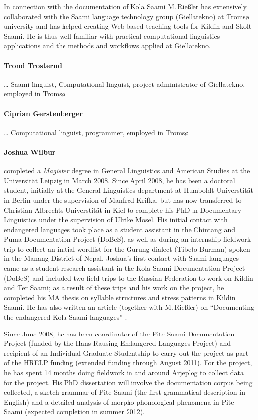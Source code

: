 \documentclass[a4paper,12pt]{article}
\begin{document}
{{{{In connection with the documentation of Kola Saami M.\,Rießler has extensively collaborated with the Saami language technology group (Giellatekno) at Tromsø university and has helped creating Web-based teaching tools for Kildin and Skolt Saami. He is thus well familiar with practical computational linguistics applications and the methods and workflows applied at Giellatekno.

\paragraph{Trond Trosterud} … Saami linguist, Computational linguist, project administrator of Giellatekno, employed in Tromsø

\paragraph{Ciprian Gerstenberger} … Computational linguist, programmer, employed in Tromsø

\paragraph{Joshua Wilbur} completed a \textit{Magister} degree in General Linguistics and American Studies at the Universität Leipzig in March 2008. Since April 2008, he has been a doctoral student, initially at the General Linguistics department at Humboldt-Universtität in Berlin under the supervision of Manfred Krifka, but has now transferred to Christian-Albrechts-Universtität in Kiel to complete his PhD in Documentary Linguistics under the supervision of Ulrike Mosel. His initial contact with endangered languages took place as a student assistant in the Chintang and Puma Documentation Project (DoBeS), as well as during an internship fieldwork trip to collect an initial wordlist for the Gurung dialect (Tibeto-Burman) spoken in the Manang District of Nepal. Joshua's first contact with Saami languages came as a student research assistant in the Kola Saami Documentation Project (DoBeS) and included two field trips to the Russian Federation to work on Kildin and Ter Saami; as a result of these trips and his work on the project, he completed his MA thesis on syllable structures and stress patterns in Kildin Saami. He has also written an article (together with M.\,Rießler) on “Documenting the endangered {K}ola {S}aami languages” \citep{riesler-etal2007}.

Since June 2008, he has been coordinator of the Pite Saami Documentation Project (funded by the Hans Rausing Endangered Languages Project) and recipient of an Individual Graduate Studentship to carry out the project as part of the HRELP funding (extended funding through August 2011). For the project, he has spent 14 months doing fieldwork in and around Arjeplog to collect data for the project. His PhD dissertation will involve the documentation corpus being collected, a sketch grammar of Pite Saami (the first grammatical description in English) and a detailed analysis of morpho-phonological phenomena in Pite Saami (expected completion in summer 2012).

}}}}
\end{document}
